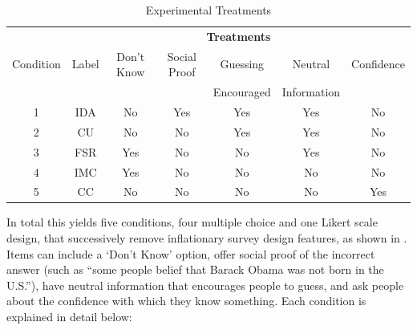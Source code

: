 \documentclass[12pt, letterpaper]{article}
\begin{document}
\begin{table}[H]
\centering
\caption{Experimental Treatments}
\label{tab:conditions}
\begin{tabular}{ccccccc}
\hline
           & \multicolumn{6}{c}{\textbf{Treatments}}              \\
 Condition & Label & Don't Know & Social Proof & Guessing   & Neutral     & Confidence \\
           &       &            &              & Encouraged & Information & \\ \hline
 1        & IDA    & No         & Yes          & Yes        &  Yes        & No         \\
 2        & CU     & No         & No           & Yes        &  Yes        & No         \\
 3        & FSR    & Yes        & No           & No         &  Yes        & No         \\
 4        & IMC    & Yes        & No           & No         &  No         & No         \\
 5        & CC     & No         & No           & No         &  No         & Yes        \\ \hline
\end{tabular}
\end{table}


In total this yields five conditions, four multiple choice and one Likert scale design, that successively remove inflationary survey design features, as shown in . Items can include a `Don't Know' option, offer social proof of the incorrect answer (such as ``some people belief that Barack Obama was not born in the U.S.''), have neutral information that encourages people to guess, and ask people about the confidence with which they know something. Each condition is explained in detail below:
\end{document}
